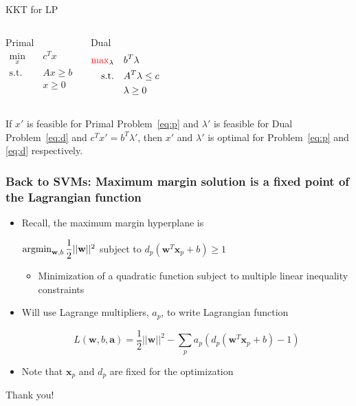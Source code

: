 \documentclass[12pt,notes,mathserif]{beamer}
\newcommand{\chuhao}{\fontsize{44.9pt}{\baselineskip}\selectfont}
\newcommand{\red}[1]{ {\color{red}{#1}} }
\begin{document}
\begin{frame}
	{KKT for LP}
	\begin{columns}
		\begin{block}{Primal}
			\begin{equation} \label{eq:p}
				\begin{aligned}
					\min_x \quad        & c^T x    \\
					\textrm{s.t.} \quad & Ax \ge b \\
					                    & x \ge 0  \\
				\end{aligned}
			\end{equation}
		\end{block}
		\begin{block}{Dual}
			\begin{equation} \label{eq:d}
				\begin{aligned}
					\red{\max}_\lambda \quad        & b^T \lambda       \\
					\textrm{s.t.} \quad & A^T \lambda \le c \\
					                    & \lambda \ge 0     \\
				\end{aligned}
			\end{equation}
		\end{block}
	\end{columns}
	\begin{theorem}
		If $x'$ is feasible for Primal Problem~\ref{eq:p} and $\lambda'$ is feasible for Dual Problem~\ref{eq:d} and $c^Tx' = b^T \lambda'$, then $x'$ and $\lambda'$ is optimal for   Problem~\ref{eq:p} and \ref{eq:d} respectively.
	\end{theorem}
\end{frame}

\begin{frame}[c]
	\frametitle{Back to SVMs: Maximum margin solution is a fixed point of the Lagrangian function}
	\begin{itemize}
		\item Recall, the maximum margin hyperplane is

		      $\mathop{\mathrm{argmin}}_{\mathbf{w},b} \dfrac{1}{2}||\mathbf{w}||^2$ subject to $d_p(\mathbf{w}^T \mathbf{x}_p+b)\geqslant{}1$
		      \begin{itemize}
			      \item Minimization of a quadratic function subject to multiple linear inequality constraints
		      \end{itemize}
		\item Will use Lagrange multipliers, $a_p$, to write Lagrangian function

		      $$L(\mathbf{w},b,\mathbf{a})=\dfrac{1}{2}||\mathbf{w}||^2-\sum_{p}a_p(d_p( \mathbf{w} ^T\mathbf{x}_p+b)-1)$$

		\item Note that $\mathbf{x}_p$ and $d_p$ are fixed for the optimization
	\end{itemize}
\end{frame}




\begin{frame}
	\begin{center}
		\chuhao Thank you! %
	\end{center}
\end{frame}
\end{document}
